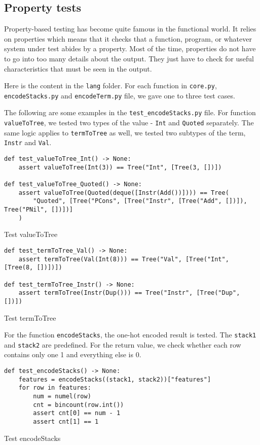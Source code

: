 \subsection{Property tests}
Property-based testing has become quite famous in the functional world. It relies on properties which means that it checks that a function, program, or whatever system under test abides by a property. Most of the time, properties do not have to go into too many details about the output. They just have to check for useful characteristics that must be seen in the output. 

Here is the content in the \texttt{lang} folder. For each function in \texttt{core.py}, \texttt{encodeStacks.py} and \texttt{encodeTerm.py} file, we gave one to three test cases.


The following are some examples in the \texttt{test\_encodeStacks.py} file. For function \texttt{valueToTree}, we tested two types of the value - \texttt{Int} and \texttt{Quoted} separately. The same logic applies to \texttt{termToTree} as well, we tested two subtypes of the term, \texttt{Instr} and \texttt{Val}.
\begin{listing}[H]
\begin{verbatim}
def test_valueToTree_Int() -> None:
    assert valueToTree(Int(3)) == Tree("Int", [Tree(3, [])])

def test_valueToTree_Quoted() -> None:
    assert valueToTree(Quoted(deque([Instr(Add())]))) == Tree(
        "Quoted", [Tree("PCons", [Tree("Instr", [Tree("Add", [])]), Tree("PNil", [])])]
    )
\end{verbatim}
\caption{Test valueToTree}
\end{listing}

\begin{listing}[H]
\begin{verbatim}
def test_termToTree_Val() -> None:
    assert termToTree(Val(Int(8))) == Tree("Val", [Tree("Int", [Tree(8, [])])])

def test_termToTree_Instr() -> None:
    assert termToTree(Instr(Dup())) == Tree("Instr", [Tree("Dup", [])])
\end{verbatim}
\caption{Test termToTree}
\end{listing}

For the function \texttt{encodeStacks}, the one-hot encoded result is tested. The \texttt{stack1} and \texttt{stack2} are predefined. For the return value, we check whether each row contains only one 1 and everything else is 0.
\begin{listing}[H]
\begin{verbatim}
def test_encodeStacks() -> None:
    features = encodeStacks((stack1, stack2))["features"]
    for row in features:
        num = numel(row)
        cnt = bincount(row.int())
        assert cnt[0] == num - 1
        assert cnt[1] == 1
\end{verbatim}
\caption{Test encodeStacks}
\end{listing}

